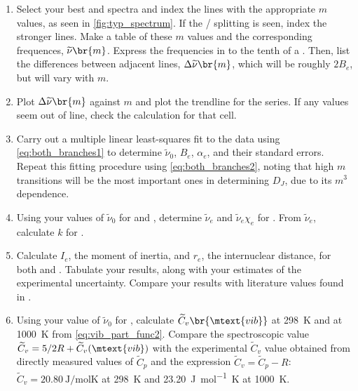 \documentclass[nobib,nofonts,nols,nohyper]{tufte-handout}
\begin{document}
\begin{enumerate}
	\item Select your best  and  spectra and index the lines with the appropriate \( m \) values, as seen in \cref{fig:typ_spectrum}. 
	If the / splitting is seen, index the stronger  lines. 
	Make a table of these \( m \) values and the corresponding frequences, \( \widetilde{\nu}\br{m} \). 
	Express the frequencies in \si{\wn} to the tenth of a \si{\wn}. 
	Then, list the differences between adjacent lines, \( \Delta{\widetilde{\nu}}\br{m} \), which will be roughly \( 2 B_e \), but will vary with \( m \). 
	\item Plot \( \Delta{\widetilde{\nu}}\br{m} \) against \( m \) and plot the trendline for the series. 
	If any values seem out of line, check the calculation for that cell. 
	\item Carry out a multiple linear least-squares fit to the data using \cref{eq:both_branches1} to determine \( \widetilde{\nu}_0 \), \( B_e \), \( \alpha_e \), and their standard errors. 
	Repeat this fitting procedure using \cref{eq:both_branches2}, noting that high \( m \) transitions will be the most important ones in determining \( D_J \), due to its \( m^3 \) dependence. 
	\item Using your values of \( \widetilde{\nu}_0 \) for  and , determine \( \widetilde{\nu}_e \) and \( \widetilde{\nu}_e \chi_e \) for . From \( \widetilde{\nu}_e \), calculate \( k \) for . 
	\item Calculate \( I_e \), the moment of inertia, and \( r_e \), the internuclear distance, for both  and . 
	Tabulate your results, along with your estimates  of the experimental uncertainty. Compare your results with literature values found in \textcite{kerr82}. 
	\item Using your value of \( \widetilde{\nu}_0 \) for , calculate \( \widetilde{C}_v\br{\mtext{vib}} \) at \SI{298}{\K} and at \SI{1000}{\K} from \cref{eq:vib_part_func2}. 
	Compare the spectroscopic value \( \widetilde{C}_v = 5/2 R + \widetilde{C}_v(\mtext{vib}) \) with the experimental \( \widetilde{C}_v \) value obtained from directly measured values\autocite{lewis61,spencer48} of \( \widetilde{C}_p \) and the expression \( \widetilde{C}_v = \widetilde{C}_p - R \): \( \widetilde{C}_v = \SI{20.80}{\J \per \mole\K} \) at \SI{298}{K} and \SI{23.20}{\J \per \mol\K} at \SI{1000}{\K}. 
\end{enumerate}
\end{document}
